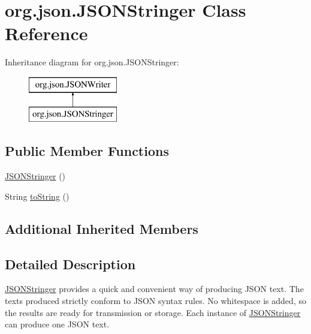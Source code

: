 \hypertarget{classorg_1_1json_1_1_j_s_o_n_stringer}{\section{org.\-json.\-J\-S\-O\-N\-Stringer Class Reference}
\label{classorg_1_1json_1_1_j_s_o_n_stringer}
}
Inheritance diagram for org.\-json.\-J\-S\-O\-N\-Stringer\-:\begin{figure}[H]
\begin{center}
\leavevmode
\includegraphics[height=2.000000cm]{classorg_1_1json_1_1_j_s_o_n_stringer}
\end{center}
\end{figure}
\subsection*{Public Member Functions}
\begin{DoxyCompactItemize}
\item 
\hyperlink{classorg_1_1json_1_1_j_s_o_n_stringer_a36d3accdcf3f40434edd9c33b414d3f9}{J\-S\-O\-N\-Stringer} ()
\item 
String \hyperlink{classorg_1_1json_1_1_j_s_o_n_stringer_a2e7f28e99eb46f767b5df8a669e774b4}{to\-String} ()
\end{DoxyCompactItemize}
\subsection*{Additional Inherited Members}


\subsection{Detailed Description}
\hyperlink{classorg_1_1json_1_1_j_s_o_n_stringer}{J\-S\-O\-N\-Stringer} provides a quick and convenient way of producing J\-S\-O\-N text. The texts produced strictly conform to J\-S\-O\-N syntax rules. No whitespace is added, so the results are ready for transmission or storage. Each instance of \hyperlink{classorg_1_1json_1_1_j_s_o_n_stringer}{J\-S\-O\-N\-Stringer} can produce one J\-S\-O\-N text. 

